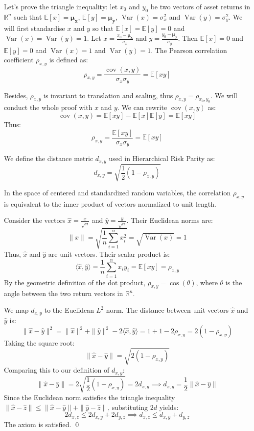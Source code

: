 \documentclass[11pt,a4paper]{article}
\begin{document}
Let's prove the triangle inequality:
let $x_0$ and $y_0$ be two vectors of asset returns in $\mathbb{R}^n$ such that $\mathbb{E}[x] = \mathbf{\mu_x}$, $\mathbb{E}[y] = \mathbf{\mu_y}$, $\operatorname{Var}(x) = \sigma_x^2$ and $\operatorname{Var}(y) = \sigma_y^2$.
We will first standardise $x$ and $y$ so that $\mathbb{E}[x] = \mathbb{E}[y] = 0$ and $\operatorname{Var}(x) = \operatorname{Var}(y) = 1$.
Let $x = \frac{x_0 - \mathbf{\mu_x}}{\sigma_x}$ and $y = \frac{y_0 - \mathbf{\mu_y}}{\sigma_y}$.
Then $\mathbb{E}[x] = 0$ and $\mathbb{E}[y] = 0$ and $\operatorname{Var}(x) = 1$ and $\operatorname{Var}(y) = 1$.
The Pearson correlation coefficient $\rho_{x,y}$ is defined as:
\[\rho_{x,y} = \frac{\operatorname{cov}(x,y)}{\sigma_x \sigma_y} = \mathbb{E}[xy]\]

Besides, $\rho_{x,y}$ is invariant to translation and scaling, thus $\rho_{x,y} = \rho_{x_0,y_0}$.
We will conduct the whole proof with $x$ and $y$.
We can rewrite $\operatorname{cov}(x,y)$ as:
\[\operatorname{cov}(x,y) = \mathbb{E}[xy] - \mathbb{E}[x]\mathbb{E}[y] = \mathbb{E}[xy]\]
Thus:
\[\rho_{x,y} = \frac{\mathbb{E}[xy]}{\sigma_x \sigma_y} = \mathbb{E}[xy]\]

We define the distance metric $d_{x,y}$ used in Hierarchical Risk Parity as:
\[d_{x,y} = \sqrt{\frac{1}{2}(1 - \rho_{x,y})}\]

In the space of centered and standardized random variables, the correlation $\rho_{x,y}$ is equivalent to the inner product of vectors normalized to unit length. 

Consider the vectors $\hat{x} = \frac{x}{\sqrt{n}}$ and $\hat{y} = \frac{y}{\sqrt{n}}$. Their Euclidean norms are:
\[\|\hat{x}\| = \sqrt{\frac{1}{n} \sum_{i=1}^n x_i^2} = \sqrt{\operatorname{Var}(x)} = 1\]
Thus, $\hat{x}$ and $\hat{y}$ are unit vectors. Their scalar product is:
\[\langle \hat{x}, \hat{y} \rangle = \frac{1}{n} \sum_{i=1}^n x_i y_i = \mathbb{E}[xy] = \rho_{x,y}\]
By the geometric definition of the dot product, $\rho_{x,y} = \cos(\theta)$, where $\theta$ is the angle between the two return vectors in $\mathbb{R}^n$.

We map $d_{x,y}$ to the Euclidean $L^2$ norm. The distance between unit vectors $\hat{x}$ and $\hat{y}$ is:
\[\|\hat{x} - \hat{y}\|^2 = \|\hat{x}\|^2 + \|\hat{y}\|^2 - 2 \langle \hat{x}, \hat{y} \rangle = 1 + 1 - 2\rho_{x,y} = 2(1 - \rho_{x,y})\]
Taking the square root:
\[\|\hat{x} - \hat{y}\| = \sqrt{2(1 - \rho_{x,y})}\]
Comparing this to our definition of $d_{x,y}$:
\[\|\hat{x} - \hat{y}\| = 2 \sqrt{\frac{1}{2}(1 - \rho_{x,y})} = 2d_{x,y} \implies d_{x,y} = \frac{1}{2} \|\hat{x} - \hat{y}\|\]
Since the Euclidean norm satisfies the triangle inequality $\|\hat{x} - \hat{z}\| \le \|\hat{x} - \hat{y}\| + \|\hat{y} - \hat{z}\|$, substituting $2d$ yields:
\[2d_{x,z} \le 2d_{x,y} + 2d_{y,z} \implies d_{x,z} \le d_{x,y} + d_{y,z}\]
The axiom is satisfied. \qed
\end{document}

